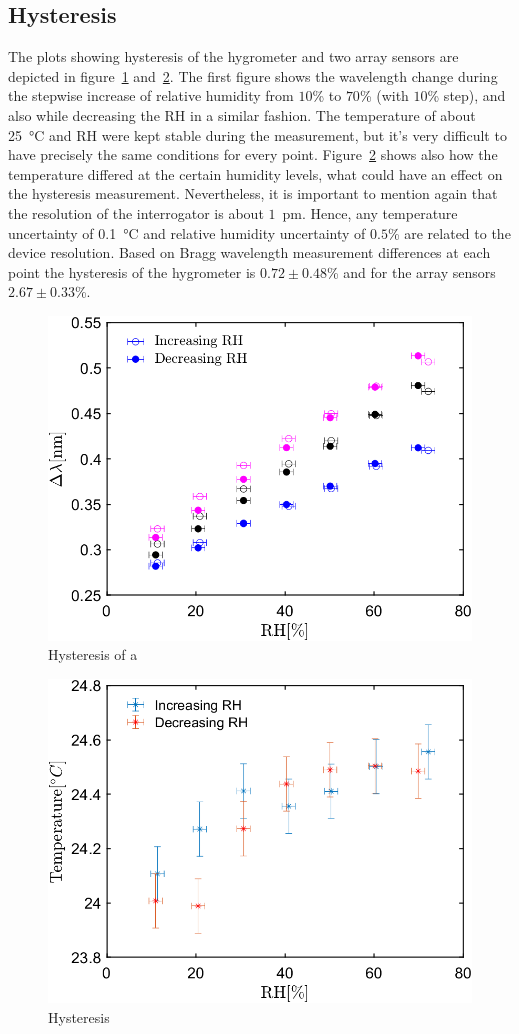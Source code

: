\subsection{Hysteresis}
The plots showing hysteresis of the hygrometer and two array sensors are depicted in figure~\ref{fig_hysteresis} and~\ref{fig_hysteresis2}. The first figure shows the wavelength change during the stepwise increase of relative humidity from $10$\% to $70$\% (with $10$\% step), and also while decreasing the \gls{RH} in a similar fashion. The temperature of about \SI{25}{\celsius} and \gls{RH} were kept stable during the measurement, but it's very difficult to have precisely the same conditions for every point.  Figure~\ref{fig_hysteresis2} shows also how the temperature differed at the certain humidity levels, what could have an effect on the hysteresis measurement. Nevertheless, it is important to mention again that the resolution of the interrogator is about $1$~pm. Hence, any temperature uncertainty of \SI{0.1}{\celsius} and relative humidity uncertainty of $0.5$\% are related to the device resolution. Based on Bragg wavelength measurement differences at each point the hysteresis of the hygrometer is $0.72\pm0.48$\% and for the array sensors $2.67\pm0.33$\%. 

\begin{figure}[!h]
\centering
\includegraphics[width=0.6\columnwidth]{Chapter5/images/25_RHS.png}
\caption{Hysteresis of a }
\label{fig_hysteresis}
\end{figure}

\begin{figure}[!h]
\centering
\includegraphics[width=0.6\columnwidth]{Chapter5/images/25_RHST.png}
\caption{Hysteresis}
\label{fig_hysteresis2}
\end{figure}

